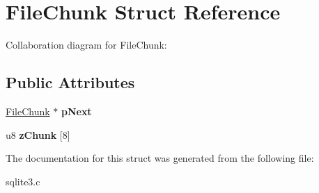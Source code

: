 \hypertarget{structFileChunk}{}\section{File\+Chunk Struct Reference}
\label{structFileChunk}


Collaboration diagram for File\+Chunk\+:
\subsection*{Public Attributes}
\begin{DoxyCompactItemize}
\item 
\hyperlink{structFileChunk}{File\+Chunk} $\ast$ {\bfseries p\+Next}\hypertarget{structFileChunk_ad2d0d170afc7ce1e239e8716852e247b}{}\label{structFileChunk_ad2d0d170afc7ce1e239e8716852e247b}

\item 
u8 {\bfseries z\+Chunk} \mbox{[}8\mbox{]}\hypertarget{structFileChunk_a1e7a92812b21bba27661fb38a5f597a7}{}\label{structFileChunk_a1e7a92812b21bba27661fb38a5f597a7}

\end{DoxyCompactItemize}


The documentation for this struct was generated from the following file\+:\begin{DoxyCompactItemize}
\item 
sqlite3.\+c\end{DoxyCompactItemize}
